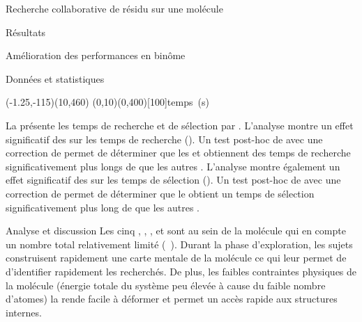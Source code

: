 \documentclass[myfrancais,ngerman,english,french]{mythesis}
\begin{document}
\begin{mychapter}{Recherche collaborative de résidu sur une molécule}
\begin{mysection}{Résultats}
\begin{mysubsection}{Amélioration des performances en binôme}
\begin{mysubsubsection}{Données et statistiques}
					\begin{myfigure}
						\begin{myps}(-1.25,-115)(10,460)
							\myaxes(0,10){}(0,400)[100]{temps~(s)}
						\end{myps}
					\end{myfigure}

					La  présente les temps de recherche et de sélection par  .
					L'analyse montre un effet significatif des   sur les temps de recherche ().
					Un test post-hoc de  avec une correction de  permet de déterminer que les   et  obtiennent des temps de recherche significativement plus longs de  que les autres .
					L'analyse montre également un effet significatif des   sur les temps de sélection ().
					Un test post-hoc de  avec une correction de  permet de déterminer que le   obtient un temps de sélection significativement plus long de  que les autres .
				\end{mysubsubsection}
				\begin{mysubsubsection}{Analyse et discussion}
					Les cinq  , , ,  et  sont au sein de la molécule \myTRPCAGE qui en compte un nombre total relativement limité (~).
					Durant la phase d'exploration, les sujets construisent rapidement une carte mentale de la molécule ce qui leur permet de d'identifier rapidement les  recherchés.
					De plus, les faibles contraintes physiques de la molécule (énergie totale du système peu élevée à cause du faible nombre d'atomes) la rende facile à déformer et permet un accès rapide aux structures internes.

\end{mysubsubsection}
\end{mysubsection}
\end{mysection}
\end{mychapter}
\end{document}
